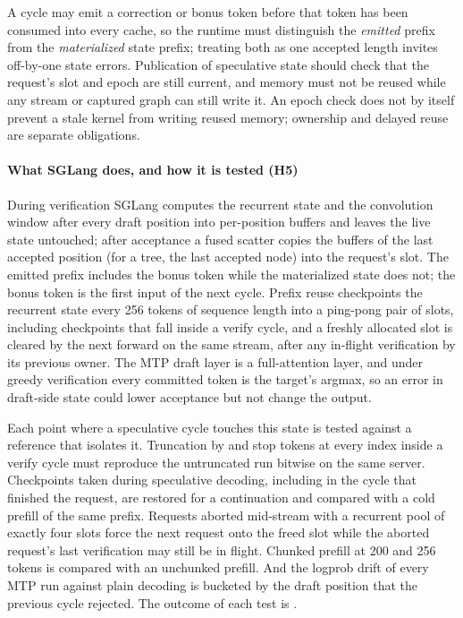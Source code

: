 A cycle may emit a correction or bonus token before that token has been consumed into every cache, so the runtime must distinguish the \emph{emitted} prefix from the \emph{materialized} state prefix; treating both as one accepted length invites off-by-one state errors. Publication of speculative state should check that the request's slot and epoch are still current, and memory must not be reused while any stream or captured graph can still write it. An epoch check does not by itself prevent a stale kernel from writing reused memory; ownership and delayed reuse are separate obligations.

\paragraph{What SGLang does, and how it is tested (H5)} During verification SGLang computes the recurrent state and the convolution window after every draft position into per-position buffers and leaves the live state untouched; after acceptance a fused scatter copies the buffers of the last accepted position (for a tree, the last accepted node) into the request's slot. The emitted prefix includes the bonus token while the materialized state does not; the bonus token is the first input of the next cycle. Prefix reuse checkpoints the recurrent state every 256 tokens of sequence length into a ping-pong pair of slots, including checkpoints that fall inside a verify cycle, and a freshly allocated slot is cleared by the next forward on the same stream, after any in-flight verification by its previous owner. The MTP draft layer is a full-attention layer, and under greedy verification every committed token is the target's argmax, so an error in draft-side state could lower acceptance but not change the output.

Each point where a speculative cycle touches this state is tested against a reference that isolates it. Truncation by  and stop tokens at every index inside a verify cycle must reproduce the untruncated run bitwise on the same server. Checkpoints taken during speculative decoding, including in the cycle that finished the request, are restored for a continuation and compared with a cold prefill of the same prefix. Requests aborted mid-stream with a recurrent pool of exactly four slots force the next request onto the freed slot while the aborted request's last verification may still be in flight. Chunked prefill at 200 and 256 tokens is compared with an unchunked prefill. And the logprob drift of every MTP run against plain decoding is bucketed by the draft position that the previous cycle rejected. The outcome of each test is .
